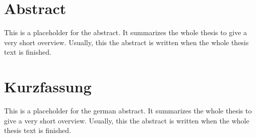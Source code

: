 \chapter*{Abstract}\label{cha:abstract}
This is a placeholder for the abstract. It summarizes the whole thesis
to give a very short overview. Usually, this the abstract is written
when the whole thesis text is finished.

\chapter*{Kurzfassung}\label{cha:abstract_german}
This is a placeholder for the german abstract. It summarizes the whole thesis
to give a very short overview. Usually, this the abstract is written
when the whole thesis text is finished.